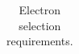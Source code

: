 \begin{table}[]
\begin{tabular}{ l  l l }
%
    \hline \hline
  \end{tabular}
   \caption{Electron selection requirements.}
   \label{table:objsel-el}
\end{table}

